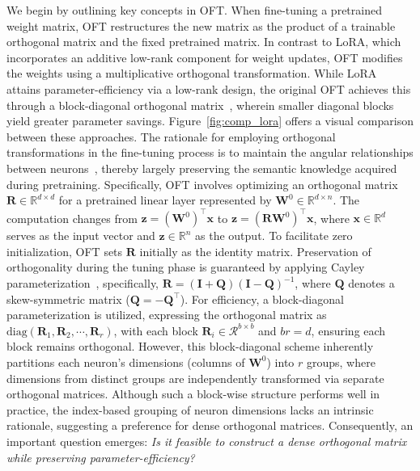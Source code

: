 We begin by outlining key concepts in OFT. When fine-tuning a pretrained weight matrix, OFT restructures the new matrix as the product of a trainable orthogonal matrix and the fixed pretrained matrix. In contrast to LoRA, which incorporates an additive low-rank component for weight updates, OFT modifies the weights using a multiplicative orthogonal transformation. While LoRA attains parameter-efficiency via a low-rank design, the original OFT achieves this through a block-diagonal orthogonal matrix~\cite{qiu2023controlling}, wherein smaller diagonal blocks yield greater parameter savings. Figure~\ref{fig:comp_lora} offers a visual comparison between these approaches. The rationale for employing orthogonal transformations in the fine-tuning process is to maintain the angular relationships between neurons~\cite{liu2018learning,liu2021orthogonal,qiu2023controlling}, thereby largely preserving the semantic knowledge acquired during pretraining. Specifically, OFT involves optimizing an orthogonal matrix $\bm{R}\in\mathbb{R}^{d\times d}$ for a pretrained linear layer represented by $\bm{W}^0\in\mathbb{R}^{d\times n}$. The computation changes from $\bm{z}=(\bm{W}^0)^\top\bm{x}$ to $\bm{z}=(\bm{R}\bm{W}^0)^\top\bm{x}$, where $\bm{x}\in\mathbb{R}^{d}$ serves as the input vector and $\bm{z}\in\mathbb{R}^{n}$ as the output. To facilitate zero initialization, OFT sets $\bm{R}$ initially as the identity matrix. Preservation of orthogonality during the tuning phase is guaranteed by applying Cayley parameterization~\cite{qiu2023controlling,liu2021orthogonal}, specifically, $\bm{R}=(\bm{I}+\bm{Q})(\bm{I}-\bm{Q})^{-1}$, where $\bm{Q}$ denotes a skew-symmetric matrix ($\bm{Q}=-\bm{Q}^\top$). For efficiency, a block-diagonal parameterization is utilized, expressing the orthogonal matrix as $\text{diag}(\bm{R}_1,\bm{R}_2,\cdots,\bm{R}_r)$, with each block $\bm{R}_i\in\mathcal{R}^{b\times b}$ and $br=d$, ensuring each block remains orthogonal. However, this block-diagonal scheme inherently partitions each neuron’s dimensions (columns of $\bm{W}^0$) into $r$ groups, where dimensions from distinct groups are independently transformed via separate orthogonal matrices. Although such a block-wise structure performs well in practice, the index-based grouping of neuron dimensions lacks an intrinsic rationale, suggesting a preference for dense orthogonal matrices. Consequently, an important question emerges: \emph{Is it feasible to construct a dense orthogonal matrix while preserving parameter-efficiency?}

